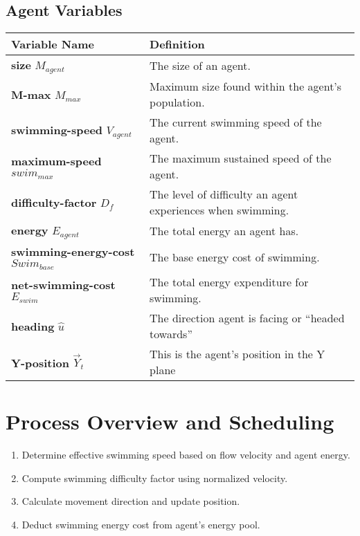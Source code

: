 \documentclass[
]{book}
\begin{document}
\subsection{Agent Variables}\label{agent-variables-3}

\begin{longtable}[]{@{}
  >{\centering\arraybackslash}p{}
  >{\centering\arraybackslash}p{}@{}}
\toprule\noalign{}
\begin{minipage}[b]{\linewidth}\centering
Variable Name
\end{minipage} & \begin{minipage}[b]{\linewidth}\centering
Definition
\end{minipage} \\
\midrule\noalign{}
\endhead
\bottomrule\noalign{}
\endlastfoot
\textbf{size} \(M_{agent}\) & The size of an agent. \\
\textbf{M-max} \(M_{max}\) & Maximum size found within the agent's population. \\
\textbf{swimming-speed} \(V_{agent}\) & The current swimming speed of the agent. \\
\textbf{maximum-speed} \(swim_{max}\) & The maximum sustained speed of the agent. \\
\textbf{difficulty-factor} \(D_{f}\) & The level of difficulty an agent experiences when swimming. \\
\textbf{energy} \(E_{agent}\) & The total energy an agent has. \\
\textbf{swimming-energy-cost} \(Swim_{base}\) & The base energy cost of swimming. \\
\textbf{net-swimming-cost} \(E_{swim}\) & The total energy expenditure for swimming. \\
\textbf{heading} \(\hat{u}\) & The direction agent is facing or ``headed towards'' \\
\textbf{Y-position} \(\vec{Y}_t\) & This is the agent's position in the Y plane \\
\end{longtable}

\section{Process Overview and Scheduling}\label{process-overview-and-scheduling-3}

\begin{enumerate}
\def\labelenumi{\arabic{enumi}.}
\item
  Determine effective swimming speed based on flow velocity and agent energy.
\item
  Compute swimming difficulty factor using normalized velocity.
\item
  Calculate movement direction and update position.
\item
  Deduct swimming energy cost from agent's energy pool.
\end{enumerate}
\end{document}
